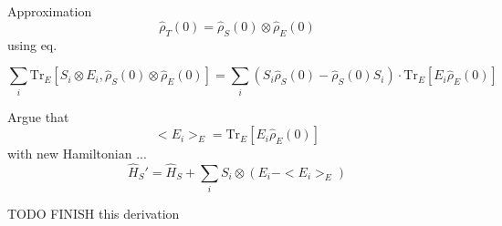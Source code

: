 Approximation
\begin{equation}
    \hat{\rho}_T(0) = \hat{\rho}_S(0) \otimes \hat{\rho}_E(0)
\end{equation}
using eq. 

\begin{equation}
    \sum_i \mathrm{Tr}_E[ S_i \otimes E_i , \hat{\rho}_S(0) \otimes \hat{\rho}_E(0)] =     \sum_i (S_i \hat{\rho}_S(0) - \hat{\rho}_S(0) S_i)\cdot  \mathrm{Tr}_E [E_i \hat{\rho}_E(0)]
\end{equation}

Argue that 
\begin{equation}
    < E_i >_E = \mathrm{Tr}_E [E_i \hat{\rho}_E(0)]
\end{equation}
with new Hamiltonian
...
\begin{equation}
    \hat{H}_S' = \hat{H}_S + \sum_i S_i \otimes (E_i - < E_i >_E)
\end{equation}


TODO FINISH this derivation